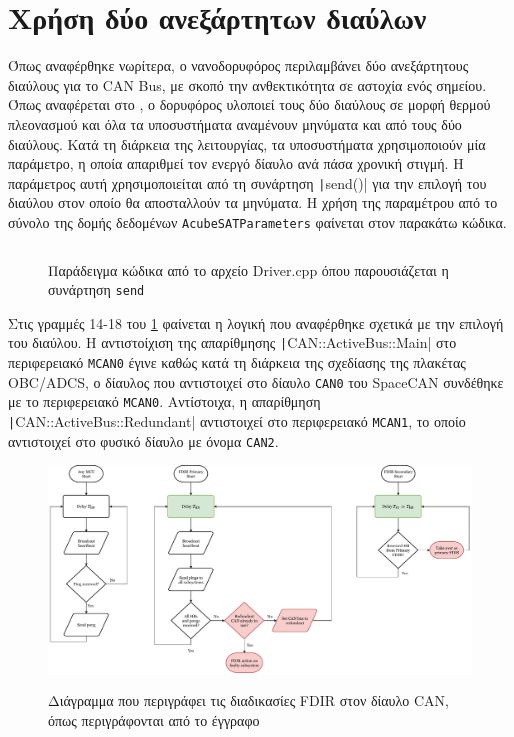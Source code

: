 \documentclass[a4paper,nobib,justified]{tufte-book}
\begin{document}
\section{Χρήση δύο ανεξάρτητων διαύλων}
Όπως αναφέρθηκε νωρίτερα, ο νανοδορυφόρος περιλαμβάνει δύο ανεξάρτητους διαύλους για το CAN Bus, με σκοπό την ανθεκτικότητα σε αστοχία ενός σημείου. Όπως αναφέρεται στο , ο δορυφόρος υλοποιεί τους δύο διαύλους σε μορφή θερμού πλεονασμού και όλα τα υποσυστήματα αναμένουν μηνύματα και από τους δύο διαύλους. Κατά τη διάρκεια της λειτουργίας, τα υποσυστήματα χρησιμοποιούν μία παράμετρο, η οποία απαριθμεί τον ενεργό δίαυλο ανά πάσα χρονική στιγμή. Η παράμετρος αυτή χρησιμοποιείται από τη συνάρτηση \texttt|send()| για την επιλογή του διαύλου στον οποίο θα αποσταλλούν τα μηνύματα. Η χρήση της παραμέτρου από το σύνολο της δομής δεδομένων \texttt{AcubeSATParameters} φαίνεται στον παρακάτω κώδικα.

\begin{figure}
	\inputminted{c++}{code/examples/driver-send.cpp}
	\label{code:driver-send}
	\caption{Παράδειγμα κώδικα από το αρχείο Driver.cpp όπου παρουσιάζεται η συνάρτηση \texttt{send}}
\end{figure}

Στις γραμμές 14-18 του \ref*{code:driver-send} φαίνεται η λογική που αναφέρθηκε σχετικά με την επιλογή του διαύλου. Η αντιστοίχιση της απαρίθμησης \texttt|CAN::ActiveBus::Main| στο περιφερειακό \texttt{MCAN0} έγινε καθώς κατά τη διάρκεια της σχεδίασης της πλακέτας OBC/ADCS, ο δίαυλος που αντιστοιχεί στο δίαυλο \texttt{CAN0} του SpaceCAN  συνδέθηκε με το περιφερειακό \texttt{MCAN0}. Αντίστοιχα, η απαρίθμηση \texttt|CAN::ActiveBus::Redundant| αντιστοιχεί στο περιφερειακό \texttt{MCAN1}, το οποίο αντιστοιχεί στο φυσικό δίαυλο με όνομα \texttt{CAN2}.

\begin{figure}[hbt!]
	\centering
	\includegraphics[width=0.8\linewidth]{media/diagrams/fdir-procedures.pdf}
	\label{fig:fdir}
	\caption{Διάγραμμα που περιγράφει τις διαδικασίες FDIR στον δίαυλο CAN, όπως περιγράφονται από το έγγραφο \cite{FMEA}}
\end{figure}
\end{document}
